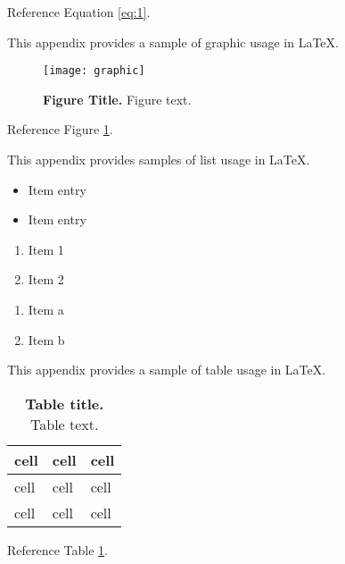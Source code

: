 Reference Equation \ref{eq:1}.


 \label{figures}

This appendix provides a sample of graphic usage in LaTeX.

\begin{figure}[hb] \centering
	\texttt{[image: graphic]}
	\caption{\textbf{Figure Title.} Figure text.}
	\label{figure:1}
\end{figure}

Reference Figure \ref{figure:1}.


 \label{lists}

This appendix provides samples of list usage in LaTeX.

 \label{unordered-lists}

\begin{itemize}
	\item Item entry
	\item Item entry
\end{itemize}

 \label{ordered-lists}

\begin{enumerate}
	\item Item 1
	\item Item 2
\end{enumerate}

 \label{alphabetical-list}

\begin{enumerate}[label=(\alph*)]
	\item Item a
	\item Item b
\end{enumerate}


 \label{tables}

This appendix provides a sample of table usage in LaTeX.

\begin{table}[H] \centering
\caption{\textbf{Table title.} Table text.}
\label{table:1}
\begin{tabular}{ p{2in} p{2in} p{2in} } 
	\toprule
	
	\textbf{cell} & \textbf{cell} & \textbf{cell} \\ 
	
	\midrule
	
	cell & cell & cell \\ 
	
	\midrule
	
	cell & cell & cell \\
	
	\bottomrule
\end{tabular}
\end{table}

Reference Table \ref{table:1}.
